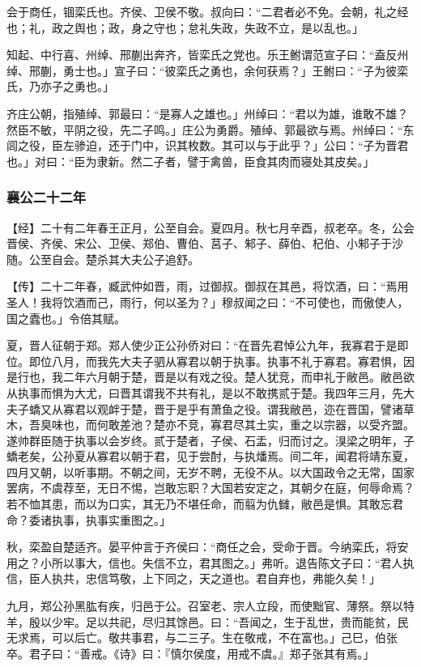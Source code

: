 \documentclass[]{article}
\begin{document}
会于商任，锢栾氏也。齐侯、卫侯不敬。叔向曰：``二君者必不免。会朝，礼之经也；礼，政之舆也；政，身之守也；怠礼失政，失政不立，是以乱也。」

知起、中行喜、州绰、邢蒯出奔齐，皆栾氏之党也。乐王鲋谓范宣子曰：``盍反州绰、邢蒯，勇士也。」宣子曰：``彼栾氏之勇也，余何获焉？」王鲋曰：``子为彼栾氏，乃亦子之勇也。」

齐庄公朝，指殖绰、郭最曰：``是寡人之雄也。」州绰曰：``君以为雄，谁敢不雄？然臣不敏，平阴之役，先二子鸣。」庄公为勇爵。殖绰、郭最欲与焉。州绰曰：``东闾之役，臣左骖迫，还于门中，识其枚数。其可以与于此乎？」公曰：``子为晋君也。」对曰：``臣为隶新。然二子者，譬于禽兽，臣食其肉而寝处其皮矣。」

\hypertarget{header-n2122}{%
\subsubsection{襄公二十二年}\label{header-n2122}}

【经】二十有二年春王正月，公至自会。夏四月。秋七月辛酉，叔老卒。冬，公会晋侯、齐侯、宋公、卫侯、郑伯、曹伯、莒子、邾子、薛伯、杞伯、小邾子于沙随。公至自会。楚杀其大夫公子追舒。

【传】二十二年春，臧武仲如晋，雨，过御叔。御叔在其邑，将饮酒，曰：``焉用圣人！我将饮酒而己，雨行，何以圣为？」穆叔闻之曰：``不可使也，而傲使人，国之蠹也。」令倍其赋。

夏，晋人征朝于郑。郑人使少正公孙侨对曰：``在晋先君悼公九年，我寡君于是即位。即位八月，而我先大夫子驷从寡君以朝于执事。执事不礼于寡君。寡君惧，因是行也，我二年六月朝于楚，晋是以有戏之役。楚人犹竞，而申礼于敝邑。敝邑欲从执事而惧为大尤，曰晋其谓我不共有礼，是以不敢携贰于楚。我四年三月，先大夫子蟜又从寡君以观衅于楚，晋于是乎有萧鱼之役。谓我敝邑，迩在晋国，譬诸草木，吾臭味也，而何敢差池？楚亦不竞，寡君尽其土实，重之以宗器，以受齐盟。遂帅群臣随于执事以会岁终。贰于楚者，子侯、石盂，归而讨之。湨梁之明年，子蟜老矣，公孙夏从寡君以朝于君，见于尝酎，与执燔焉。间二年，闻君将靖东夏，四月又朝，以听事期。不朝之间，无岁不聘，无役不从。以大国政令之无常，国家罢病，不虞荐至，无日不惕，岂敢忘职？大国若安定之，其朝夕在庭，何辱命焉？若不恤其患，而以为口实，其无乃不堪任命，而翦为仇雠，敝邑是惧。其敢忘君命？委诸执事，执事实重图之。」

秋，栾盈自楚适齐。晏平仲言于齐侯曰：``商任之会，受命于晋。今纳栾氏，将安用之？小所以事大，信也。失信不立，君其图之。」弗听。退告陈文子曰：``君人执信，臣人执共，忠信笃敬，上下同之，天之道也。君自弃也，弗能久矣！」

九月，郑公孙黑肱有疾，归邑于公。召室老、宗人立段，而使黜官、薄祭。祭以特羊，殷以少牢。足以共祀，尽归其馀邑。曰：``吾闻之，生于乱世，贵而能贫，民无求焉，可以后亡。敬共事君，与二三子。生在敬戒，不在富也。」己巳，伯张卒。君子曰：``善戒。《诗》曰：『慎尔侯度，用戒不虞。』郑子张其有焉。」
\end{document}
